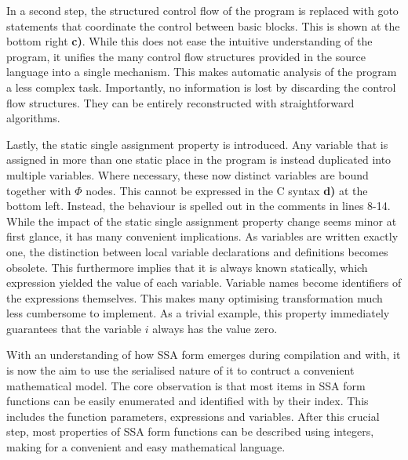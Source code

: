     In a second step, the structured control flow of the program is replaced
    with goto statements that coordinate the control between basic blocks.
    This is shown at the bottom right {\bf c)}.
    While this does not ease the intuitive understanding of the program, it
    unifies the many control flow structures provided in the source language
    into a single mechanism.
    This makes automatic analysis of the program a less complex task.
    Importantly, no information is lost by discarding the control flow
    structures.
    They can be entirely reconstructed with straightforward algorithms.

    Lastly, the static single assignment property is introduced.
    Any variable that is assigned in more than one static place in the program
    is instead duplicated into multiple variables.
    Where necessary, these now distinct variables are bound together with
    $\Phi$ nodes.
    This cannot be expressed in the C syntax {\bf d)} at the bottom left.
    Instead, the behaviour is spelled out in the comments in lines 8-14.
    While the impact of the static single assignment property change seems minor
    at first glance, it has many convenient implications.
    As variables are written exactly one, the distinction between local variable
    declarations and definitions becomes obsolete.
    This furthermore implies that it is always known statically, which
    expression yielded the value of each variable.
    Variable names become identifiers of the expressions themselves.
    This makes many optimising transformation much less cumbersome to
    implement.
    As a trivial example, this property immediately guarantees that the variable
    $i$ always has the value zero.

    With an understanding of how SSA form emerges during compilation and with,
    it is now the aim to use the serialised nature of it to contruct a
    convenient mathematical model.
    The core observation is that most items in SSA form functions can be easily
    enumerated and identified with by their index.
    This includes the function parameters, expressions and variables.
    After this crucial step, most properties of SSA form functions can be
    described using integers, making for a convenient and easy mathematical
    language.

